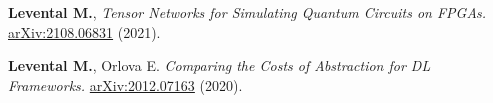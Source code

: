\documentclass[11pt,letterpaper,roman,colorlinks,linkcolor=blue]{moderncv}
\begin{document}
\begin{hangingpar}
\textbf{Levental M.},
\textit{Tensor Networks for Simulating Quantum Circuits on FPGAs.} 
\href{https://arxiv.org/abs/2108.06831}{arXiv:2108.06831} (2021).
\end{hangingpar}

\begin{hangingpar}
\textbf{Levental M.}, Orlova E.
\textit{Comparing the Costs of Abstraction for DL Frameworks.} 
\href{https://arxiv.org/abs/2012.07163}{arXiv:2012.07163} (2020).
\end{hangingpar}

%
%
%
\end{document}

